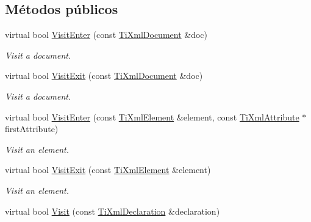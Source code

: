 \subsection*{Métodos públicos}
\begin{DoxyCompactItemize}
\item 
\hypertarget{class_ti_xml_printer_a2ec73087db26ff4d2c4316c56f861db7}{virtual bool \hyperlink{class_ti_xml_printer_a2ec73087db26ff4d2c4316c56f861db7}{Visit\-Enter} (const \hyperlink{class_ti_xml_document}{Ti\-Xml\-Document} \&doc)}\label{class_ti_xml_printer_a2ec73087db26ff4d2c4316c56f861db7}

\begin{DoxyCompactList}\small\item\em Visit a document. \end{DoxyCompactList}\item 
\hypertarget{class_ti_xml_printer_a0a636046fa589b6d7f3e5bd025b3f33e}{virtual bool \hyperlink{class_ti_xml_printer_a0a636046fa589b6d7f3e5bd025b3f33e}{Visit\-Exit} (const \hyperlink{class_ti_xml_document}{Ti\-Xml\-Document} \&doc)}\label{class_ti_xml_printer_a0a636046fa589b6d7f3e5bd025b3f33e}

\begin{DoxyCompactList}\small\item\em Visit a document. \end{DoxyCompactList}\item 
\hypertarget{class_ti_xml_printer_a6dccaf5ee4979f13877690afe28721e8}{virtual bool \hyperlink{class_ti_xml_printer_a6dccaf5ee4979f13877690afe28721e8}{Visit\-Enter} (const \hyperlink{class_ti_xml_element}{Ti\-Xml\-Element} \&element, const \hyperlink{class_ti_xml_attribute}{Ti\-Xml\-Attribute} $\ast$first\-Attribute)}\label{class_ti_xml_printer_a6dccaf5ee4979f13877690afe28721e8}

\begin{DoxyCompactList}\small\item\em Visit an element. \end{DoxyCompactList}\item 
\hypertarget{class_ti_xml_printer_ae6a1df8271df4bf62d7873c38e34aa69}{virtual bool \hyperlink{class_ti_xml_printer_ae6a1df8271df4bf62d7873c38e34aa69}{Visit\-Exit} (const \hyperlink{class_ti_xml_element}{Ti\-Xml\-Element} \&element)}\label{class_ti_xml_printer_ae6a1df8271df4bf62d7873c38e34aa69}

\begin{DoxyCompactList}\small\item\em Visit an element. \end{DoxyCompactList}\item 
\hypertarget{class_ti_xml_printer_adaf7eec4dc43ad071ff52b60361574f5}{virtual bool \hyperlink{class_ti_xml_printer_adaf7eec4dc43ad071ff52b60361574f5}{Visit} (const \hyperlink{class_ti_xml_declaration}{Ti\-Xml\-Declaration} \&declaration)}\label{class_ti_xml_printer_adaf7eec4dc43ad071ff52b60361574f5}


\end{DoxyCompactItemize}
